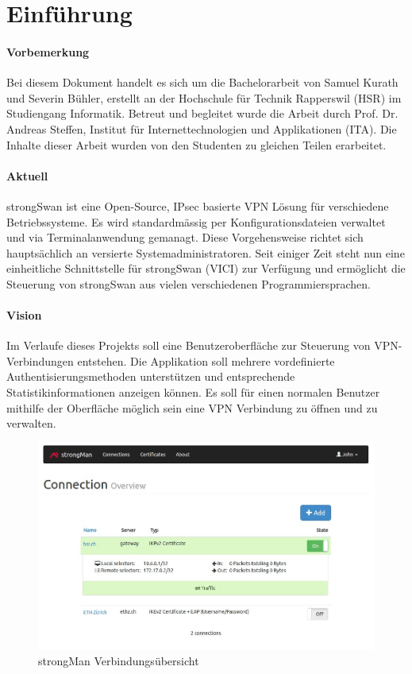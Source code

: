 \section{Einführung}
\label{subsec:vision}

\paragraph{Vorbemerkung}
Bei diesem Dokument handelt es sich um die Bachelorarbeit von Samuel Kurath und Severin Bühler, erstellt an der Hochschule für Technik Rapperswil (HSR) im Studiengang
Informatik. Betreut und begleitet wurde die Arbeit durch Prof. Dr. Andreas Steffen, Institut für Internettechnologien und Applikationen (ITA). Die Inhalte dieser Arbeit
wurden von den Studenten zu gleichen Teilen erarbeitet.

\paragraph{Aktuell}
strongSwan ist eine Open-Source, IPsec basierte VPN Lösung für verschiedene Betriebssysteme. Es wird standardmässig per Konfigurationsdateien verwaltet und via Terminalanwendung gemanagt. Diese Vorgehensweise richtet sich hauptsächlich an versierte Systemadministratoren. Seit einiger Zeit steht nun eine einheitliche Schnittstelle für strongSwan (VICI) zur Verfügung und ermöglicht die Steuerung von strongSwan aus vielen verschiedenen Programmiersprachen.

\paragraph{Vision} 
Im Verlaufe dieses Projekts soll eine Benutzeroberfläche zur Steuerung von VPN-Verbindungen entstehen. Die Applikation soll mehrere vordefinierte Authentisierungsmethoden  unterstützen und entsprechende Statistikinformationen anzeigen können. Es soll für einen normalen Benutzer mithilfe der Oberfläche möglich sein eine VPN Verbindung zu öffnen und zu verwalten.\\


\begin{figure}[H]
\centering
\includegraphics[width=440pt]{images/strongMan_einfuhrung.jpg}
\caption[strongMan Verbindungsübersicht]{strongMan Verbindungsübersicht}
\end{figure}